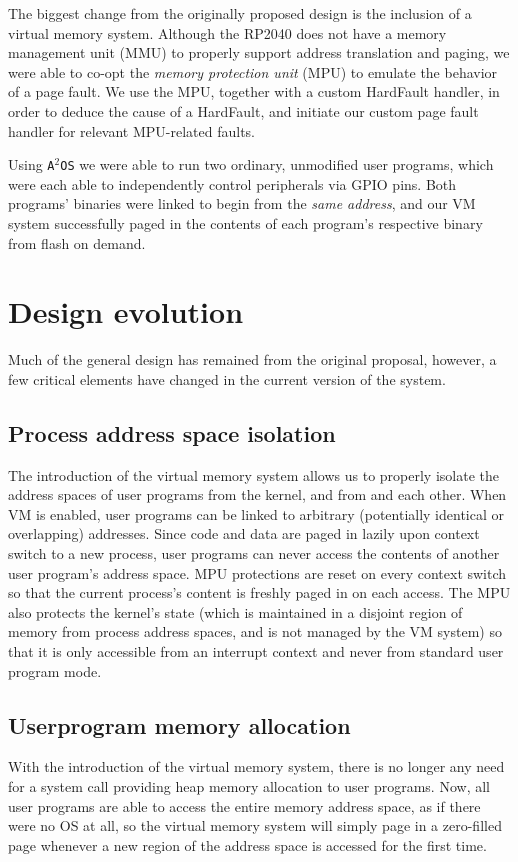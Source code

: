 \documentclass[12pt]{article}
\newcommand{\os}{\texttt{A$^2$OS} }
\begin{document}
The biggest change from the originally proposed design is the inclusion of a
virtual memory system. Although the RP2040 does not have a memory management
unit (MMU) to properly support address translation and paging, we were able
to co-opt the \emph{memory protection unit} (MPU) to emulate the behavior of a
page fault. We use the MPU, together with a custom HardFault handler, in order
to deduce the cause of a HardFault, and initiate our custom page fault handler
for relevant MPU-related faults.

Using \os we were able to run two ordinary, unmodified user programs, which were
each able to independently control peripherals via GPIO pins. Both programs'
binaries were linked to begin from the \emph{same address}, and our VM system
successfully paged in the contents of each program's respective binary from
flash on demand.


\section{Design evolution}
Much of the general design has remained from the original proposal, however, a
few critical elements have changed in the current version of the system.

\subsection{Process address space isolation}
The introduction of the virtual memory system allows us to properly isolate
the address spaces of user programs from the kernel, and from and each other.
When VM is enabled, user programs can be linked to arbitrary (potentially
identical or overlapping) addresses. Since code and data are paged in lazily
upon context switch to a new process, user programs can never access the
contents of another user program's address space. MPU protections are reset on
every context switch so that the current process's content is freshly paged in
on each access. The MPU also protects the kernel's state (which is maintained in
a disjoint region of memory from process address spaces, and is not managed by
the VM system) so that it is only accessible from an interrupt context and never
from standard user program mode.

\subsection{Userprogram memory allocation}
With the introduction of the virtual memory system, there is no longer any need
for a system call providing heap memory allocation to user programs. Now, all
user programs are able to access the entire memory address space, as if there
were no OS at all, so the virtual memory system will simply page in a 
zero-filled page whenever a new region of the address space is accessed for the
first time.
\end{document}
